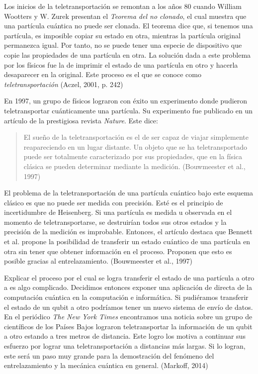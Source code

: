 \documentclass[11pt,a4paper]{article}
\begin{document}
Los inicios de la teletransportación se remontan a los años 80 cuando William Wootters y W. Zurek presentan el \textit{Teorema del no clonado}, el cual muestra que una partícula cuántica no puede ser clonada. El teorema dice que, si tenemos una partícula, es imposible copiar su estado en otra, mientras la partícula original permanezca igual.  Por tanto, no se puede tener una especie de dispositivo que copie las propiedades de una partícula en otra. La solución dada a este problema por los físicos fue la de imprimir el estado de una partícula en otro y hacerla desaparecer en la original. Este proceso es el que se conoce como \textit{teletransportación}  (Aczel, 2001, p. 242)

En 1997, un grupo de físicos lograron con éxito un experimento donde pudieron teletransportar cuánticamente una partícula. Su experimento fue publicado en un artículo de la prestigiosa revista \textit{Nature}. Este dice:
\begin{quote}
El sueño de la teletransportación es el de ser capaz de viajar simplemente reapareciendo en un lugar distante. Un objeto que se ha teletransportado puede ser totalmente caracterizado por sus propiedades, que en la física clásica se pueden determinar mediante la medición. (Bouwmeester et al., 1997)
\end{quote}

El problema de la teletransportación de una partícula cuántico bajo este esquema clásico es que no puede ser medida con precisión. Esté es el principio de incertidumbre de Heisenberg. Si una partícula es medida u observada en el momento de teletransportarse, se destruirían todos sus otros estados y la precisión de la medición es improbable. Entonces, el artículo destaca que Bennett et al. propone la posibilidad de transferir un estado cuántico de una partícula en otra sin tener que obtener información en el proceso. Proponen que esto es posible gracias al entrelazamiento. (Bouwmeester et al., 1997)

Explicar el proceso por el cual se logra transferir el estado de una partícula a otro a es algo complicado. Decidimos entonces exponer una aplicación de directa de la computación cuántica en la computación e informática. Si pudiéramos transferir el estado de un qubit a otro podríamos tener un nuevo sistema de envío de datos. En el periódico \textit{The New York Times} encontramos una noticia sobre un grupo de científicos de los Países Bajos lograron teletransportar la información de un qubit a otro estando a tres metros de distancia. Este logro los motiva a continuar sus esfuerzo por lograr una teletransportación a distancias más largas. Si lo logran, este será un paso muy grande para la demostración del fenómeno del entrelazamiento y la mecánica cuántica en general. (Markoff, 2014)
\clearpage
\end{document}
